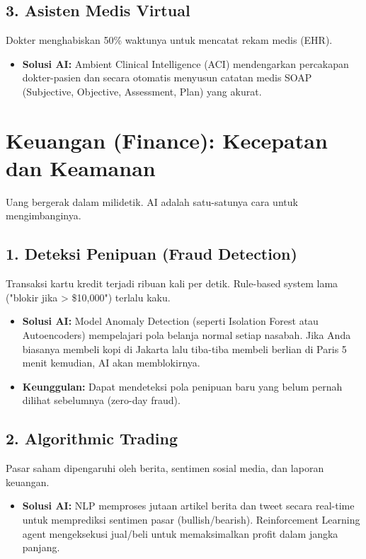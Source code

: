 \subsection{3. Asisten Medis Virtual}
Dokter menghabiskan 50\% waktunya untuk mencatat rekam medis (EHR).
\begin{itemize}
    \item \textbf{Solusi AI:} Ambient Clinical Intelligence (ACI) mendengarkan percakapan dokter-pasien dan secara otomatis menyusun catatan medis SOAP (Subjective, Objective, Assessment, Plan) yang akurat.
\end{itemize}

\section{Keuangan (Finance): Kecepatan dan Keamanan}

Uang bergerak dalam milidetik. AI adalah satu-satunya cara untuk mengimbanginya.

\subsection{1. Deteksi Penipuan (Fraud Detection)}
Transaksi kartu kredit terjadi ribuan kali per detik. Rule-based system lama ("blokir jika > \$10,000") terlalu kaku.
\begin{itemize}
    \item \textbf{Solusi AI:} Model Anomaly Detection (seperti Isolation Forest atau Autoencoders) mempelajari pola belanja normal setiap nasabah. Jika Anda biasanya membeli kopi di Jakarta lalu tiba-tiba membeli berlian di Paris 5 menit kemudian, AI akan memblokirnya.
    \item \textbf{Keunggulan:} Dapat mendeteksi pola penipuan baru yang belum pernah dilihat sebelumnya (zero-day fraud).
\end{itemize}

\subsection{2. Algorithmic Trading}
Pasar saham dipengaruhi oleh berita, sentimen sosial media, dan laporan keuangan.
\begin{itemize}
    \item \textbf{Solusi AI:} NLP memproses jutaan artikel berita dan tweet secara real-time untuk memprediksi sentimen pasar (bullish/bearish). Reinforcement Learning agent mengeksekusi jual/beli untuk memaksimalkan profit dalam jangka panjang.
\end{itemize}


